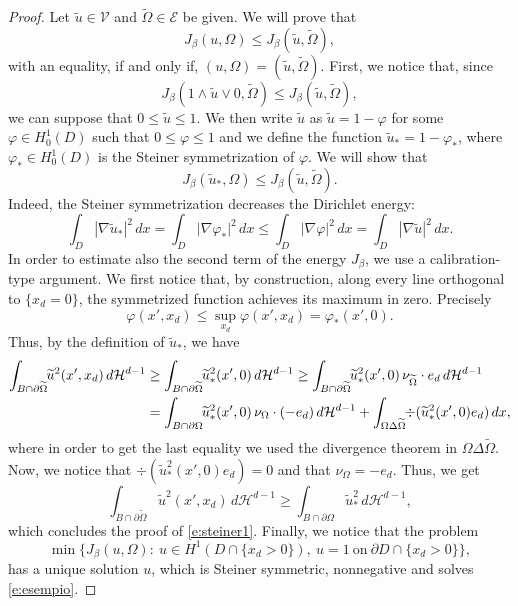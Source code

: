 \documentclass[11pt]{article}
\numberwithin{equation}{section}
\theoremstyle{plain}
\theoremstyle{definition}
\def\HH{\mathcal{H}}
\begin{document}
\begin{proof}
Let $\widetilde u\in \mathcal V$ and $\widetilde\Omega\in \mathcal E$ be given. We will prove that
\[J_\beta(u,\Omega)\le J_\beta(\widetilde u,\widetilde\Omega),\]
with an equality, if and only if, $(u,\Omega)=(\widetilde u,\widetilde\Omega)$. First, we notice that, since
\[
J_\beta(1\wedge\widetilde u\vee0,\widetilde\Omega)\le J_\beta(\widetilde u,\widetilde\Omega),
\]
we can suppose that $0\le \widetilde u\le 1$. We then write $\widetilde u$ as $\widetilde u=1-\varphi$ for some $\varphi\in H^1_0(D)$ such that $0\le \varphi\le 1$ and we define the function $\widetilde u_\ast=1-\varphi_\ast$, where $\varphi_\ast\in H^1_0(D)$ is the Steiner symmetrization of $\varphi$. We will show that
\begin{equation}\label{e:steiner1}
J_\beta(\widetilde u_\ast,\Omega)\le J_\beta(\widetilde u,\widetilde\Omega).
\end{equation}
Indeed, the Steiner symmetrization decreases the Dirichlet energy:
\[\int_D|\nabla \widetilde u_\ast|^2\,dx=\int_D|\nabla \varphi_\ast|^2\,dx\le \int_D|\nabla \varphi|^2\,dx=\int_D|\nabla \widetilde u|^2\,dx.\]
In order to estimate also the second term of the energy $J_\beta$, we use a calibration-type argument.
We first notice that, by construction, along every line orthogonal to $\{x_d=0\}$, the symmetrized function achieves its maximum in zero. Precisely
\[\varphi(x',x_d)\le \sup_{x_d}\varphi(x',x_d)=\varphi_\ast(x',0).\]
Thus, by the definition of $\widetilde u_\ast$, we have
\begin{align*}
\int_{B\cap\partial\widetilde\Omega}\hspace*{-1mm}\widetilde u^2(x',x_d)\,d\HH^{d-1}&\ge \int_{B\cap\partial\widetilde \Omega}\hspace*{-1mm}\widetilde u_\ast^2(x',0)\,d\HH^{d-1}\ge \int_{B\cap\partial\widetilde\Omega}\hspace*{-1mm}\widetilde u_\ast^2(x',0)\,\nu_{\widetilde\Omega}\cdot e_d\,d\HH^{d-1}\\
&= \int_{B\cap\partial\Omega}\hspace*{-1mm}\widetilde u_\ast^2(x',0)\, \nu_{\Omega}\cdot(-e_d)\,d\HH^{d-1}+\int_{\Omega\Delta\widetilde\Omega}\hspace*{-1mm}\div(\widetilde u_\ast^2(x',0)e_d)\,dx,
\end{align*}
where in order to get the last equality we used the divergence theorem in $\Omega\Delta\widetilde\Omega$. Now, we notice that $\div(\widetilde u_\ast^2(x',0)e_d)=0$ and that $\nu_\Omega=-e_d$.
Thus, we get
\[\int_{B\cap\partial\widetilde\Omega}\widetilde u^2(x',x_d)\,d\HH^{d-1}\ge \int_{B\cap\partial\Omega}\widetilde u_\ast^2\,d\HH^{d-1},\]
which concludes the proof of \eqref{e:steiner1}. Finally, we notice that the problem
\begin{equation*}
\min\big\{J_\beta(u,\Omega):\ u\in H^1(D\cap \{x_d>0\}),\ u=1\ \text{on}\ \partial D\cap\{x_d>0\}\big\},
\end{equation*}
has a unique solution $u$, which is Steiner symmetric, nonnegative and solves \eqref{e:esempio}.
\end{proof}
\end{document}
